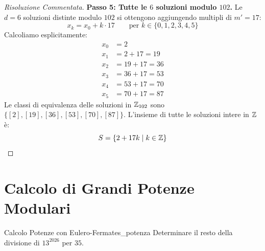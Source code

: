 \begin{proof}[Risoluzione Commentata]
\textbf{Passo 5: Tutte le $6$ soluzioni modulo $102$.}
Le $d = 6$ soluzioni distinte modulo $102$ si ottengono aggiungendo multipli di $m' = 17$:
\[
    x_k = x_0 + k \cdot 17 \qquad \text{per } k \in \{0, 1, 2, 3, 4, 5\}
\]
Calcoliamo esplicitamente:
\begin{align*}
    x_0 &= 2 \\
    x_1 &= 2 + 17 = 19 \\
    x_2 &= 19 + 17 = 36 \\
    x_3 &= 36 + 17 = 53 \\
    x_4 &= 53 + 17 = 70 \\
    x_5 &= 70 + 17 = 87
\end{align*}
Le classi di equivalenza delle soluzioni in $\mathbb{Z}_{102}$ sono $\{[2], [19], [36], [53], [70], [87]\}$.
L'insieme di tutte le soluzioni intere in $\mathbb{Z}$ è:
\[
    S = \{2 + 17k \mid k \in \mathbb{Z}\}
\]
\end{proof}

\section{Calcolo di Grandi Potenze Modulari}

\begin{esercizio}{Calcolo Potenze con Eulero-Fermat}{es_potenza}
Determinare il resto della divisione di $13^{2026}$ per $35$.
\end{esercizio}

